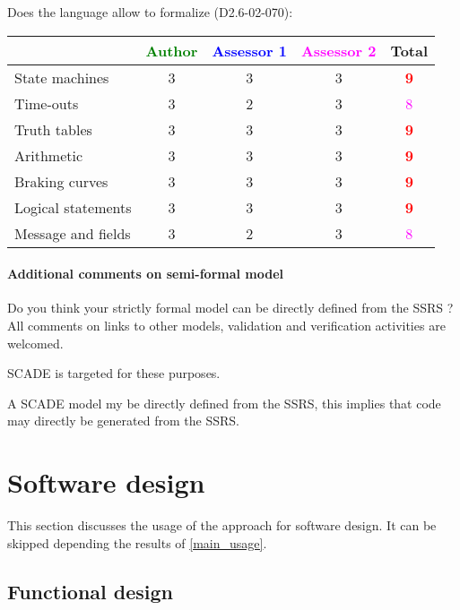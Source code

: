 Does the language allow to  formalize (D2.6-02-070):

\begin{tabular}{|l | c | c | c | c|}
\hline
& \textcolor{green}{Author} & \textcolor{blue}{Assessor 1} & \textcolor{magenta}{Assessor 2} & Total \\
\hline 
State machines  & 3     & 3     &3 & \textcolor{red}{\textbf{9}} \\
\hline
Time-outs  & 3     & 2     &3 & \textcolor{magenta}{8} \\
\hline
Truth tables  & 3     & 3     &3 & \textcolor{red}{\textbf{9}} \\
\hline
Arithmetic  & 3    & 3     &3 & \textcolor{red}{\textbf{9}} \\
\hline
Braking curves  & 3    & 3     &3 & \textcolor{red}{\textbf{9}} \\
\hline
Logical statements & 3    & 3     &3 & \textcolor{red}{\textbf{9}} \\
\hline
Message and fields &3 & 2     &3 & \textcolor{magenta}{8} \\
\hline
\end{tabular}

\paragraph{Additional comments on semi-formal  model} Do you think your strictly formal  model can be directly defined from the SSRS ?
All comments on links to  other models, validation and verification activities are welcomed.

\begin{author_comment}
SCADE is targeted for these purposes.   
\end{author_comment}
\begin{assessor2}
A SCADE model my be directly defined from the SSRS, this implies that
code may directly be generated from the SSRS.
\end{assessor2}


\section{Software design}
This section discusses the usage of the approach for software design.
It can be skipped depending the results of \ref{main_usage}.

\subsection{Functional design}

